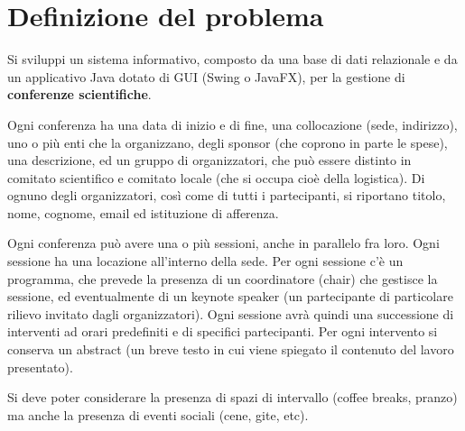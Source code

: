 \section{Definizione del problema}
Si sviluppi un sistema informativo, composto da una base di dati relazionale e da un applicativo Java dotato di GUI (Swing o JavaFX), per la gestione di \textbf{conferenze scientifiche}. 
\bigskip

Ogni conferenza ha una data di inizio e di fine, una collocazione (sede, indirizzo), uno o più enti che la organizzano, degli sponsor (che coprono in parte le spese), una descrizione, ed un gruppo di organizzatori, che può essere distinto in comitato scientifico e comitato locale (che si occupa cioè della logistica). Di ognuno degli organizzatori, così come di tutti i partecipanti, si riportano titolo, nome, cognome, email ed istituzione di afferenza. 
\bigskip

Ogni conferenza può avere una o più sessioni, anche in parallelo fra loro. Ogni sessione ha una locazione all'interno della sede. Per ogni
sessione c'è un programma, che prevede la presenza di un coordinatore (chair) che gestisce la sessione, ed eventualmente di un keynote speaker (un partecipante di particolare rilievo invitato dagli organizzatori). Ogni sessione avrà quindi una successione di interventi ad orari predefiniti e di specifici partecipanti. Per ogni intervento si conserva un abstract (un breve testo in cui viene spiegato il contenuto del lavoro presentato).
\bigskip

Si deve poter considerare la presenza di spazi di intervallo (coffee breaks, pranzo) ma anche la presenza di eventi sociali (cene, gite, etc).